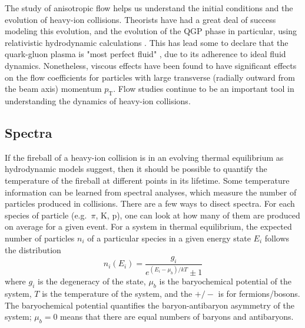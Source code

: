 The study of anisotropic flow helps us understand the initial conditions and the evolution of heavy-ion collisions.
Theorists have had a great deal of success modeling  this evolution, and the evolution of the QGP phase in particular, using relativistic hydrodynamic calculations \cite{Heinz:2013th}.
This has lead some to declare that the quark-gluon plasma is "most perfect fluid" \cite{Heinz:2005zg}, due to its adherence to ideal fluid dynamics.
Nonetheless, viscous effects have been found to have significant effects on the flow coefficients for particles with large transverse (radially outward from the beam axis) momentum $p_\mathrm{T}$.
Flow studies continue to be an important tool in understanding the dynamics of heavy-ion collisions.

\subsection{Spectra}

If the fireball of a heavy-ion collision is in an evolving thermal equilibrium as hydrodynamic models suggest, then it should be possible to quantify the temperature of the fireball at different points in its lifetime.
Some temperature information can be learned from spectral analyses, which measure the number of particles produced in collisions.
There are a few ways to disect spectra.
For each species of particle (e.g.\ $\pi$, K, p), one can look at how many of them are produced on average for a given event.
For a system in thermal equilibrium, the expected number of particles $n_i$ of a particular species in a given energy state $E_i$ follows the distribution
\begin{equation}
\label{eq:ThermalDistribution}
n_i(E_i) = \frac{g_i}{e^{(E_i - \mu_b)/kT} \pm 1}
\end{equation}
where $g_i$ is the degeneracy of the state, $\mu_b$ is the baryochemical potential of the system,  $T$ is the temperature of the system, and the  $+/-$ is for fermions/bosons. 
The baryochemical potential quantifies the baryon-antibaryon asymmetry of the system; $\mu_b = 0$ means that there are equal numbers of baryons and antibaryons.


